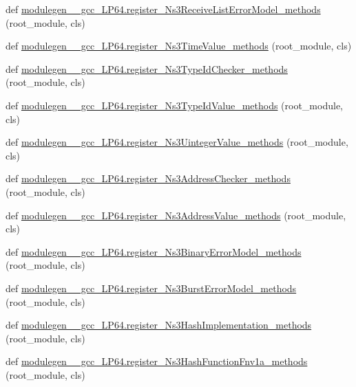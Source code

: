 \begin{DoxyCompactItemize}
\item 
def \hyperlink{namespacemodulegen____gcc__LP64_a8b4ca1e9f793ecc9b372bbe65a1206be}{modulegen\+\_\+\+\_\+gcc\+\_\+\+L\+P64.\+register\+\_\+\+Ns3\+Receive\+List\+Error\+Model\+\_\+methods} (root\+\_\+module, cls)
\item 
def \hyperlink{namespacemodulegen____gcc__LP64_a074f52c8db74b3898d974bf33a0240f8}{modulegen\+\_\+\+\_\+gcc\+\_\+\+L\+P64.\+register\+\_\+\+Ns3\+Time\+Value\+\_\+methods} (root\+\_\+module, cls)
\item 
def \hyperlink{namespacemodulegen____gcc__LP64_aaf5d00575008532556e0df2d3b8d5bef}{modulegen\+\_\+\+\_\+gcc\+\_\+\+L\+P64.\+register\+\_\+\+Ns3\+Type\+Id\+Checker\+\_\+methods} (root\+\_\+module, cls)
\item 
def \hyperlink{namespacemodulegen____gcc__LP64_ab25f30f66f8ae8da64444bac683dac7c}{modulegen\+\_\+\+\_\+gcc\+\_\+\+L\+P64.\+register\+\_\+\+Ns3\+Type\+Id\+Value\+\_\+methods} (root\+\_\+module, cls)
\item 
def \hyperlink{namespacemodulegen____gcc__LP64_a78f03cf0c89b39801a32f427d56d54df}{modulegen\+\_\+\+\_\+gcc\+\_\+\+L\+P64.\+register\+\_\+\+Ns3\+Uinteger\+Value\+\_\+methods} (root\+\_\+module, cls)
\item 
def \hyperlink{namespacemodulegen____gcc__LP64_a89e9f561a2c1e1e454b475d69805122f}{modulegen\+\_\+\+\_\+gcc\+\_\+\+L\+P64.\+register\+\_\+\+Ns3\+Address\+Checker\+\_\+methods} (root\+\_\+module, cls)
\item 
def \hyperlink{namespacemodulegen____gcc__LP64_afbde1a3f3b1b9e58c7c95df3cbbef1ae}{modulegen\+\_\+\+\_\+gcc\+\_\+\+L\+P64.\+register\+\_\+\+Ns3\+Address\+Value\+\_\+methods} (root\+\_\+module, cls)
\item 
def \hyperlink{namespacemodulegen____gcc__LP64_a36af6415854ac4246c92fe9652cc2e06}{modulegen\+\_\+\+\_\+gcc\+\_\+\+L\+P64.\+register\+\_\+\+Ns3\+Binary\+Error\+Model\+\_\+methods} (root\+\_\+module, cls)
\item 
def \hyperlink{namespacemodulegen____gcc__LP64_a5192a453283fb891aaaabd18b48cbef8}{modulegen\+\_\+\+\_\+gcc\+\_\+\+L\+P64.\+register\+\_\+\+Ns3\+Burst\+Error\+Model\+\_\+methods} (root\+\_\+module, cls)
\item 
def \hyperlink{namespacemodulegen____gcc__LP64_afdc62559dc296b925757fa93e7cd4260}{modulegen\+\_\+\+\_\+gcc\+\_\+\+L\+P64.\+register\+\_\+\+Ns3\+Hash\+Implementation\+\_\+methods} (root\+\_\+module, cls)
\item 
def \hyperlink{namespacemodulegen____gcc__LP64_ae9b88db2dea3c59f886d0be14d039694}{modulegen\+\_\+\+\_\+gcc\+\_\+\+L\+P64.\+register\+\_\+\+Ns3\+Hash\+Function\+Fnv1a\+\_\+methods} (root\+\_\+module, cls)

\end{DoxyCompactItemize}

